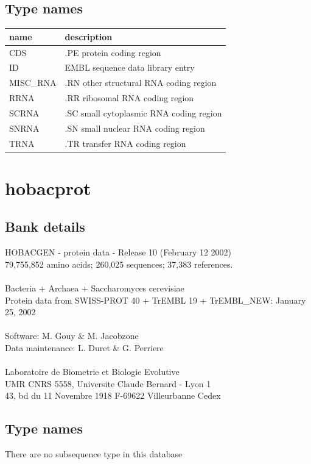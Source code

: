\documentclass{article}
\begin{document}
\begin{Schunk}
\subsection{Type names}
\noindent\begin{tabular}{ll}
\hline \hline
name & description\\
\hline
CDS & .PE protein coding region \\
ID & EMBL sequence data library entry \\
MISC\_RNA & .RN other structural RNA coding region \\
RRNA & .RR ribosomal RNA coding region \\
SCRNA & .SC small cytoplasmic RNA coding region \\
SNRNA & .SN small nuclear RNA coding region \\
TRNA & .TR transfer RNA coding region \\
\hline \hline
\end{tabular}

\section{ hobacprot }
\subsection{Bank details}
HOBACGEN - protein data - Release 10 (February 12 2002)\\
79,755,852 amino acids; 260,025 sequences; 37,383 references.\\
\\
Bacteria + Archaea + Saccharomyces cerevisiae\\
Protein data from SWISS-PROT 40 + TrEMBL 19 + TrEMBL\_NEW: January 25, 2002\\
\\
Software: M. Gouy \& M. Jacobzone\\
Data maintenance: L. Duret \& G. Perriere\\
\\
Laboratoire de Biometrie et Biologie Evolutive\\
UMR CNRS 5558, Universite Claude Bernard - Lyon 1\\
43, bd du 11 Novembre 1918 F-69622 Villeurbanne Cedex\\


\subsection{Type names}
There are no subsequence type in this database

\end{Schunk}
\end{document}
